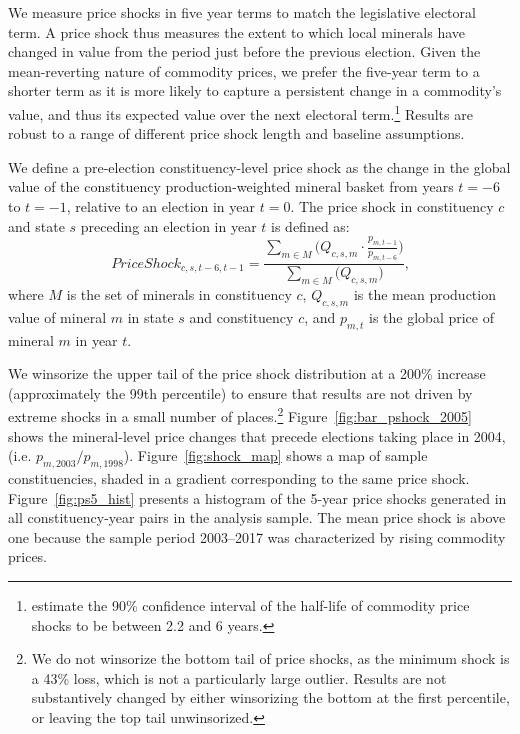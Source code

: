 \documentclass[12pt,letterpaper]{article}
\begin{document}
We measure price shocks in five year terms to match the legislative
electoral term. A price shock thus measures the extent to which local
minerals have changed in value from the period just before the
previous election. Given the mean-reverting nature of commodity
prices, we prefer the five-year term to a shorter term as it is more
likely to capture a persistent change in a commodity's value, and thus
its expected value over the next electoral
term.\footnote{ estimate the 90\% confidence
  interval of the half-life of commodity price shocks to be between
  2.2 and 6 years.} Results are robust to a range of different price
shock length and baseline assumptions.

We define a pre-election constituency-level price shock as the
change in the global value of the constituency production-weighted
mineral basket from years $t=-6$ to $t=-1$, relative to an election in
year $t=0$. The price shock in constituency $c$ and state $s$
preceding an election in year $t$ is defined as:
%
\begin{equation}
  \label{eq:ps}
  PriceShock_{c,s,t-6,t-1} = \frac{\sum_{m \in
      M}\big(Q_{c,s,m}\cdot\frac{p_{m,t-1}}{p_{m,t-6}}\big)}
  {\sum_{m \in
      M}\big(Q_{c,s,m}\big)}
  \text{,}
\end{equation}
% 
where $M$ is the set of minerals in constituency $c$, $Q_{c,s,m}$ is
the mean production value of mineral $m$ in state $s$
and constituency $c$, and $p_{m,t}$ is the global price of mineral $m$
in year $t$.

We winsorize the upper tail of the price shock distribution at a 200\%
increase (approximately the 99th percentile) to ensure that results
are not driven by extreme shocks in a small number of
places.\footnote{We do not winsorize the bottom tail of price shocks,
  as the minimum shock is a 43\% loss, which is not a particularly
  large outlier. Results are not substantively changed by either
  winsorizing the bottom at the first percentile, or leaving the top
  tail unwinsorized.}  Figure~\ref{fig:bar_pshock_2005} shows the
mineral-level price changes that precede elections taking place in
2004, (i.e. $p_{m,2003}/p_{m,1998}$). Figure~\ref{fig:shock_map}
shows a map of sample constituencies, shaded in a gradient
corresponding to the same price
shock. Figure~\ref{fig:ps5_hist} presents a histogram of the 5-year
price shocks generated in all constituency-year pairs in the 
analysis sample. The mean price shock is above one because the sample
period 2003--2017 was characterized by rising commodity prices.
\end{document}
